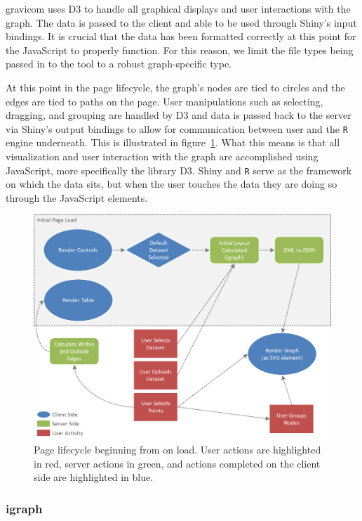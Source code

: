 \documentclass{article}\usepackage[]{graphicx}\usepackage[]{color}
\begin{document}
gravicom uses D3 to handle all graphical displays and user interactions with the graph. The data is passed to the client and able to be used through Shiny's input bindings. It is crucial that the data has been formatted correctly at this point for the JavaScript to properly function. For this reason, we limit the file types being passed in to the tool to a robust graph-specific type.

At this point in the page lifecycle, the graph's nodes are tied to circles and the edges are tied to paths on the page. User manipulations such as selecting, dragging, and grouping are handled by D3 and  data is passed back to the server via Shiny's output bindings to allow for communication between user and the {\tt R} engine underneath. This is illustrated in figure~\ref{fig:pagelifecycle}. What this means is that all visualization and user interaction with the graph are accomplished using JavaScript, more specifically the library D3. Shiny and {\tt R} serve as the framework on which the data sits, but when the user touches the data they are doing so through the JavaScript elements. 

\begin{figure}[hbtp]
\centering
\includegraphics[width=\textwidth]{images/pagelifecycle.png}
\caption{\label{fig:pagelifecycle} Page lifecycle beginning from on load. User actions are highlighted in red, server actions in green, and actions completed on the client side are highlighted in blue.}
\end{figure}


\subsubsection{igraph}
\end{document}
